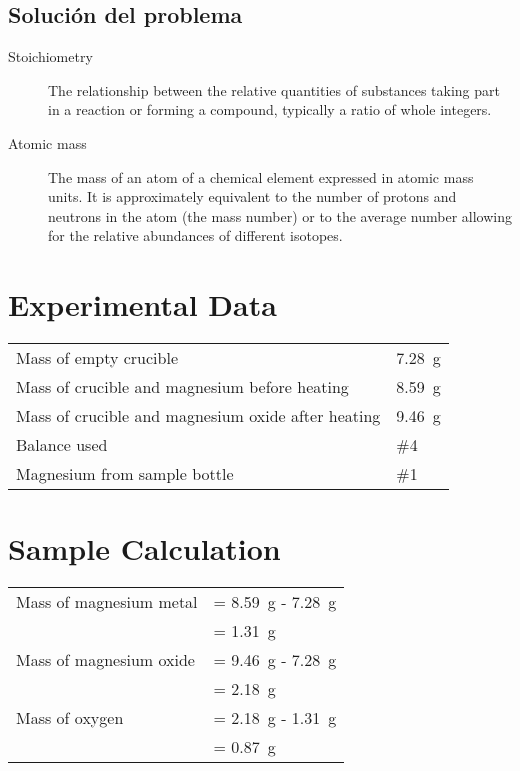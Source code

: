 \documentclass{article}
\begin{document}
\subsection{Soluci\'on del problema}

\label{definitions}
\begin{description}
\item[Stoichiometry]
The relationship between the relative quantities of substances taking part in a reaction or forming a compound, typically a ratio of whole integers.
\item[Atomic mass]
The mass of an atom of a chemical element expressed in atomic mass units. It is approximately equivalent to the number of protons and neutrons in the atom (the mass number) or to the average number allowing for the relative abundances of different isotopes. 
\end{description} 
 

\section{Experimental Data}

\begin{tabular}{ll}
Mass of empty crucible & \SI{7.28}{\gram}\\
Mass of crucible and magnesium before heating & \SI{8.59}{\gram}\\
Mass of crucible and magnesium oxide after heating & \SI{9.46}{\gram}\\
Balance used & \#4\\
Magnesium from sample bottle & \#1
\end{tabular}


\section{Sample Calculation}

\begin{tabular}{ll}
Mass of magnesium metal & = \SI{8.59}{\gram} - \SI{7.28}{\gram}\\
& = \SI{1.31}{\gram}\\
Mass of magnesium oxide & = \SI{9.46}{\gram} - \SI{7.28}{\gram}\\
& = \SI{2.18}{\gram}\\
Mass of oxygen & = \SI{2.18}{\gram} - \SI{1.31}{\gram}\\
& = \SI{0.87}{\gram}
\end{tabular}
\end{document}
